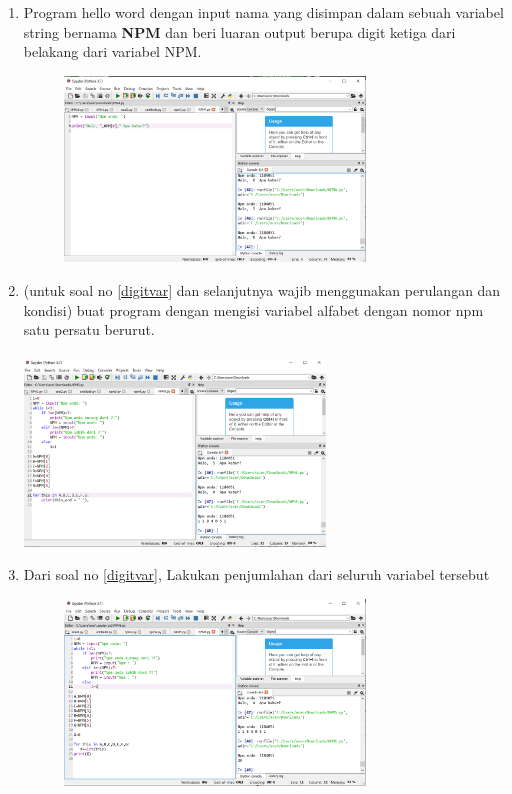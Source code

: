 \begin{enumerate}
\item
Program hello word dengan input nama yang disimpan dalam sebuah variabel string bernama \textbf{NPM} dan beri luaran output berupa digit ketiga dari belakang dari variabel NPM.
\begin{figure}[h]
\centerline{\includegraphics[width=8cm]{figures/npm4.PNG}}
\end{figure}


\item
\label{digitvar}
(untuk soal no \ref{digitvar} dan selanjutnya wajib menggunakan perulangan dan kondisi) buat program dengan mengisi variabel alfabet dengan nomor npm satu persatu berurut.
\paragraph{}
\centerline{\includegraphics[width=8cm]{figures/npm5.PNG}}


\item
Dari soal no \ref{digitvar}, Lakukan penjumlahan dari seluruh variabel tersebut
\begin{figure}[h]
\centerline{\includegraphics[width=8cm]{figures/npm6.PNG}}
\end{figure}



\end{enumerate}
